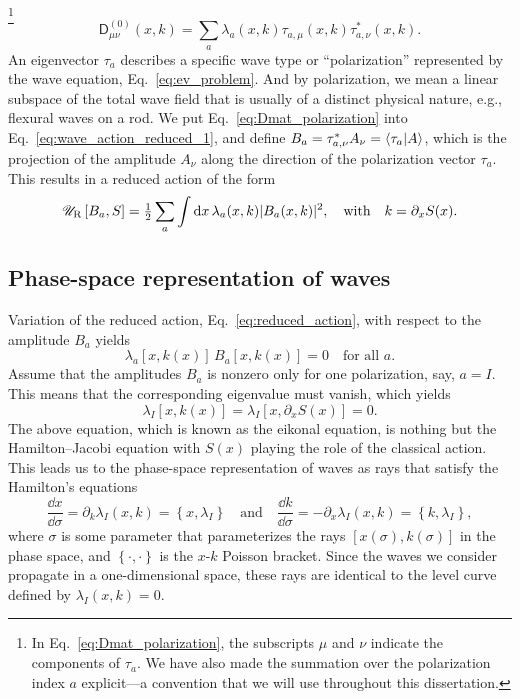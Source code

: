 \footnote{In Eq.~\eqref{eq:Dmat_polarization}, the subscripts $\mu$ and $\nu$ indicate the components of $\tau_{a}$.
We have also made the summation over the polarization index $a$ explicit---a convention that we will use throughout this dissertation.}
%
\begin{equation}
  \mathsf{D}^{(0)}_{\mu\nu}(x, k) = \sum_{a} \lambda_{a}(x, k) \tau_{a, \mu}(x, k) \tau_{a, \nu}^{*}(x, k).
  \label{eq:Dmat_polarization}
\end{equation}
%
An eigenvector $\tau_{a}$ describes a specific wave type or ``polarization'' represented by the wave equation, Eq.~\eqref{eq:ev_problem}.
And by polarization, we mean a linear subspace of the total wave field that is usually of a distinct physical nature, e.g., flexural waves on a rod.
We put Eq.~\eqref{eq:Dmat_polarization} into Eq.~\eqref{eq:wave_action_reduced_1}, and define $B_{a} = \tau_{a, \nu}^{*}A_{\nu} = \mathinner{\langle{\tau_{a}|A}\rangle}$, which is the projection of the amplitude $A_{\nu}$ along the direction of the polarization vector $\tau_{a}$.
This results in a reduced action of the form
%
\begin{equation}
  \mathscr{U}_{\text{R}}\left[B_{a}, S\right] = \tfrac{1}{2} \sum_{a} \int \mathrm{d}{x}\, \lambda_{a}(x,k) \lvert B_{a}(x, k)\rvert^{2},
  \quad\text{with}\quad
  k = \partial_{x}S(x).
  \label{eq:reduced_action}
\end{equation}

\subsection{Phase-space representation of waves}

Variation of the reduced action, Eq.~\eqref{eq:reduced_action}, with respect to the amplitude $B_{a}$ yields
%
\begin{equation}
  \lambda_{a}[x, k(x)]\,B_{a}[x, k(x)] = 0
  \quad\text{for all $a$}.
\end{equation}
%
Assume that the amplitudes $B_{a}$ is nonzero only for one polarization, say, $a = I$.
This means that the corresponding eigenvalue must vanish, which yields
%
\begin{equation}
  \lambda_{I}\left[x, k(x)\right] = \lambda_{I}\left[x, \partial_{x}S(x)\right] = 0.
  \label{eq:eikonal}
\end{equation}
%
The above equation, which is known as the eikonal equation, is nothing but the Hamilton--Jacobi equation with $S(x)$ playing the role of the classical action.
 This leads us to the phase-space representation of waves as rays that satisfy the Hamilton's equations
%
\begin{equation}
  \frac{\dd{x}}{\dd{\sigma}} = \partial_{k}\lambda_{I}(x, k) = \left\{x, \lambda_{I}\right\}
  \quad\text{and}\quad
  \frac{\dd{k}}{\dd{\sigma}} = -\partial_{x}\lambda_{I}(x, k) = \left\{k, \lambda_{I}\right\},
\end{equation}
%
where $\sigma$ is some parameter that parameterizes the rays $[x(\sigma), k(\sigma)]$ in the phase space, and $\left\{\cdot, \cdot\right\}$ is the $x$-$k$ Poisson bracket.
Since the waves we consider propagate in a one-dimensional space, these rays are identical to the level curve defined by $\lambda_{I}(x, k) = 0$.

